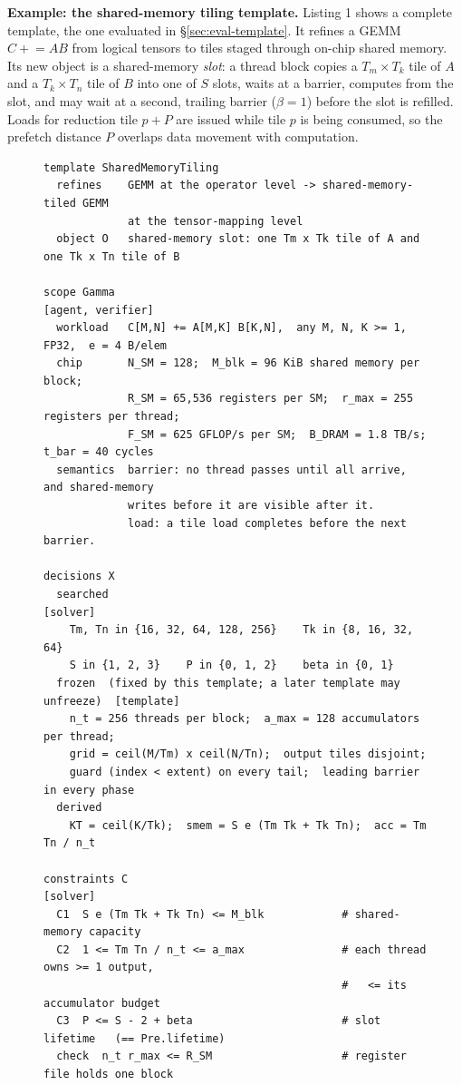 \documentclass[11pt]{article}
\begin{document}
\textbf{Example: the shared-memory tiling template.} Listing 1 shows a complete template, the one evaluated in §\ref{sec:eval-template}. It refines a GEMM \(C \mathrel{+}= AB\) from logical tensors to tiles staged through on-chip shared memory. Its new object is a shared-memory \emph{slot}: a thread block copies a \(T_m\times T_k\) tile of \(A\) and a \(T_k\times T_n\) tile of \(B\) into one of \(S\) slots, waits at a barrier, computes from the slot, and may wait at a second, trailing barrier (\(\beta=1\)) before the slot is refilled. Loads for reduction tile \(p+P\) are issued while tile \(p\) is being consumed, so the prefetch distance \(P\) overlaps data movement with computation.

\begin{figure}[tp]
\begin{framed}
\footnotesize
\begin{verbatim}
template SharedMemoryTiling
  refines    GEMM at the operator level -> shared-memory-tiled GEMM
             at the tensor-mapping level
  object O   shared-memory slot: one Tm x Tk tile of A and one Tk x Tn tile of B

scope Gamma                                                 [agent, verifier]
  workload   C[M,N] += A[M,K] B[K,N],  any M, N, K >= 1,  FP32,  e = 4 B/elem
  chip       N_SM = 128;  M_blk = 96 KiB shared memory per block;
             R_SM = 65,536 registers per SM;  r_max = 255 registers per thread;
             F_SM = 625 GFLOP/s per SM;  B_DRAM = 1.8 TB/s;  t_bar = 40 cycles
  semantics  barrier: no thread passes until all arrive, and shared-memory
             writes before it are visible after it.
             load: a tile load completes before the next barrier.

decisions X
  searched                                                           [solver]
    Tm, Tn in {16, 32, 64, 128, 256}    Tk in {8, 16, 32, 64}
    S in {1, 2, 3}    P in {0, 1, 2}    beta in {0, 1}
  frozen  (fixed by this template; a later template may unfreeze)  [template]
    n_t = 256 threads per block;  a_max = 128 accumulators per thread;
    grid = ceil(M/Tm) x ceil(N/Tn);  output tiles disjoint;
    guard (index < extent) on every tail;  leading barrier in every phase
  derived
    KT = ceil(K/Tk);  smem = S e (Tm Tk + Tk Tn);  acc = Tm Tn / n_t

constraints C                                                        [solver]
  C1  S e (Tm Tk + Tk Tn) <= M_blk            # shared-memory capacity
  C2  1 <= Tm Tn / n_t <= a_max               # each thread owns >= 1 output,
                                              #   <= its accumulator budget
  C3  P <= S - 2 + beta                       # slot lifetime   (== Pre.lifetime)
  check  n_t r_max <= R_SM                    # register file holds one block


\end{verbatim}
\end{framed}
\end{figure}
\end{document}
